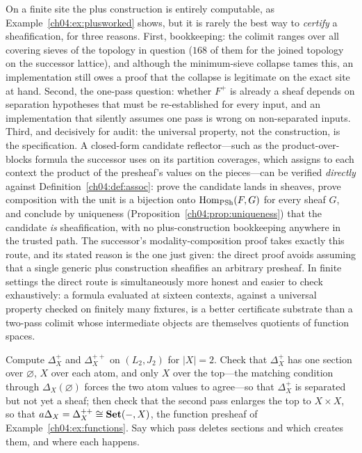\begin{remark}\label{ch04:rem:direct}
On a finite site the plus construction is entirely computable, as
Example~\ref{ch04:ex:plusworked} shows, but it is rarely the best way to
\emph{certify} a sheafification, for three reasons. First, bookkeeping: the
colimit ranges over all covering sieves of the topology in question ($168$ of
them for the joined topology on the successor
lattice), and although the minimum-sieve collapse tames this, an implementation
still owes a proof that the collapse is legitimate on the exact site at hand.
Second, the one-pass question: whether $F^{+}$ is already a sheaf depends on
separation hypotheses that must be re-established for every input, and an
implementation that silently assumes one pass is wrong on non-separated
inputs. Third, and decisively for audit: the universal property, not the
construction, is the specification. A closed-form candidate reflector---such
as the product-over-blocks formula the successor uses on its partition
coverages, which assigns to each context the product of the presheaf's values
on the pieces---can be verified \emph{directly} against
Definition~\ref{ch04:def:assoc}: prove the candidate lands in sheaves, prove
composition with the unit is a bijection onto $\mathrm{Hom}_{\mathrm{PSh}}(F,G)$ for every
sheaf $G$, and conclude by uniqueness (Proposition~\ref{ch04:prop:uniqueness})
that the candidate \emph{is} sheafification, with no plus-construction
bookkeeping anywhere in the trusted path. The successor's
modality-composition proof takes exactly this route, and its stated reason is
the one just given: the direct proof avoids assuming that a single generic
plus construction sheafifies an arbitrary presheaf. In finite settings the
direct route is simultaneously more honest and easier to check exhaustively:
a formula evaluated at sixteen contexts, against a universal property checked
on finitely many fixtures, is a better certificate substrate than a two-pass
colimit whose intermediate objects are themselves quotients of function
spaces.
\end{remark}

\begin{exercise}\label{ch04:exr:plus}
Compute $\Delta_X^{+}$ and $\Delta_X^{++}$ on $(L_2,J_2)$ for $|X|=2$. Check
that $\Delta_X^{+}$ has one section over $\varnothing$, $X$ over each atom,
and only $X$ over the top---the matching condition through
$\Delta_X(\varnothing)$ forces the two atom values to agree---so that
$\Delta_X^{+}$ is separated but not yet a sheaf; then check that the second
pass enlarges the top to $X\times X$, so that
$a\Delta_X=\Delta_X^{++}\cong\mathbf{Set}(-,X)$, the function presheaf of
Example~\ref{ch04:ex:functions}. Say which pass deletes sections and which
creates them, and where each happens.
\end{exercise}

